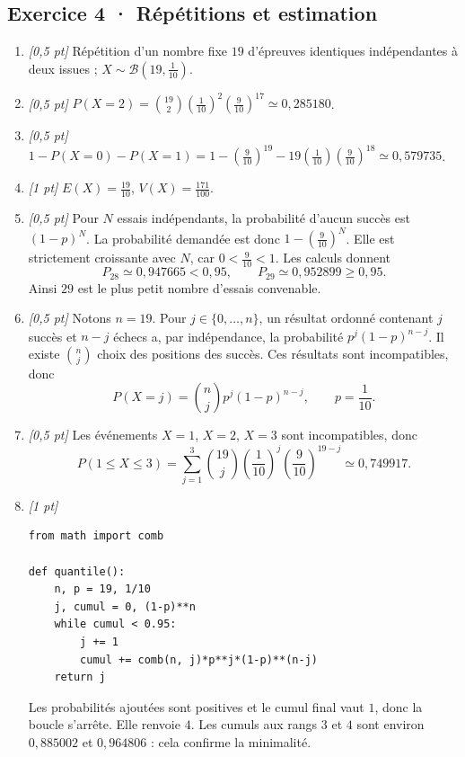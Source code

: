 \subsection*{Exercice 4 · Répétitions et estimation}\begin{enumerate}

\item \textit{[0,5 pt]} Répétition d'un nombre fixe $19$ d'épreuves identiques indépendantes à deux issues ; $X\sim\mathcal B(19,\frac{1}{10})$.

\item \textit{[0,5 pt]} $P(X=2)=\binom{19}2(\frac{1}{10})^2(\frac{9}{10})^{17}\simeq0{,}285180$.

\item \textit{[0,5 pt]} $1-P(X=0)-P(X=1)=1-(\frac{9}{10})^{19}-19(\frac{1}{10})(\frac{9}{10})^{18}\simeq0{,}579735$.

\item \textit{[1 pt]} $E(X)=\frac{19}{10}$, $V(X)=\frac{171}{100}$.

\item \textit{[0,5 pt]} Pour $N$ essais indépendants, la probabilité d'aucun succès est $(1-p)^N$. La probabilité demandée est donc $1-(\frac{9}{10})^N$. Elle est strictement croissante avec $N$, car $0<\frac{9}{10}<1$. Les calculs donnent
\[P_{28}\simeq0{,}947665<0{,}95,\qquad P_{29}\simeq0{,}952899\ge0{,}95.\]
Ainsi $29$ est le plus petit nombre d'essais convenable.

\item \textit{[0,5 pt]} Notons $n=19$. Pour $j\in\{0,\ldots,n\}$, un résultat ordonné contenant $j$ succès et $n-j$ échecs a, par indépendance, la probabilité $p^j(1-p)^{n-j}$. Il existe $\binom nj$ choix des positions des succès. Ces résultats sont incompatibles, donc
\[P(X=j)=\binom nj p^j(1-p)^{n-j},\qquad p=\frac{1}{10}.\]

\item \textit{[0,5 pt]} Les événements $X=1$, $X=2$, $X=3$ sont incompatibles, donc
\[P(1\le X\le3)=\sum_{j=1}^3\binom{19}j(\frac{1}{10})^j(\frac{9}{10})^{19-j}\simeq0{,}749917.\]


\item \textit{[1 pt]} 
\begin{lstlisting}
from math import comb

def quantile():
    n, p = 19, 1/10
    j, cumul = 0, (1-p)**n
    while cumul < 0.95:
        j += 1
        cumul += comb(n, j)*p**j*(1-p)**(n-j)
    return j
\end{lstlisting}
Les probabilités ajoutées sont positives et le cumul final vaut $1$, donc la boucle s'arrête. Elle renvoie $4$. Les cumuls aux rangs $3$ et $4$ sont environ $0{,}885002$ et $0{,}964806$ : cela confirme la minimalité.

\end{enumerate}

\fi

\fi

